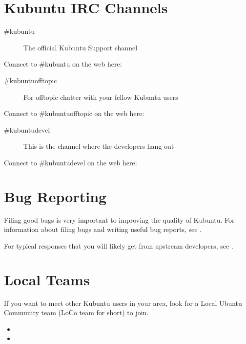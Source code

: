 \documentclass[letterpaper,10pt,english]{sphinxmanual}
\begin{document}
\section{Kubuntu IRC Channels}
\label{\detokenize{docs/contribute:kubuntu-irc-channels}}\begin{description}
\item[{\#kubuntu}] \leavevmode
\sphinxAtStartPar
The official Kubuntu Support channel

\end{description}

\sphinxAtStartPar
Connect to \#kubuntu on the web here: 
\begin{description}
\item[{\#kubuntu\sphinxhyphen{}offtopic}] \leavevmode
\sphinxAtStartPar
For off\sphinxhyphen{}topic chatter with your fellow Kubuntu users

\end{description}

\sphinxAtStartPar
Connect to \#kubuntu\sphinxhyphen{}offtopic on the web here: 
\begin{description}
\item[{\#kubuntu\sphinxhyphen{}devel}] \leavevmode
\sphinxAtStartPar
This is the channel where the developers hang out

\end{description}

\sphinxAtStartPar
Connect to \#kubuntu\sphinxhyphen{}devel on the web here: 


\section{Bug Reporting}
\label{\detokenize{docs/contribute:bug-reporting}}
\sphinxAtStartPar
Filing good bugs is very important to improving the quality of Kubuntu. For information about filing bugs and writing useful bug reports, see .

\sphinxAtStartPar
For typical responses that you will likely get from upstream  developers, see .


\section{Local Teams}
\label{\detokenize{docs/contribute:local-teams}}
\sphinxAtStartPar
If you want to meet other Kubuntu users in your area, look for a Local Ubuntu Community team (LoCo team for short) to join.
\begin{itemize}
\item {} 
\sphinxAtStartPar
{}

\item {} 
\sphinxAtStartPar
{}

\end{itemize}
\end{document}
